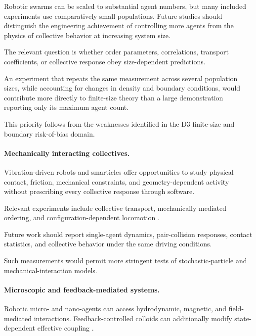 Robotic swarms can be scaled to
substantial agent numbers, but many
included experiments use comparatively
small populations. Future studies
should distinguish the engineering
achievement of controlling more agents
from the physics of collective
behavior at increasing system size.

The relevant question is whether
order parameters, correlations,
transport coefficients, or
collective response obey
size-dependent predictions.

An experiment that repeats the same
measurement across several population
sizes, while accounting for changes
in density and boundary conditions,
would contribute more directly to
finite-size theory than a
large demonstration reporting
only its maximum agent count.

This priority follows from the
weaknesses identified in the
D3 finite-size and boundary
risk-of-bias domain.

\paragraph*{Mechanically interacting collectives.}

Vibration-driven robots and smarticles
offer opportunities to study physical
contact, friction, mechanical
constraints, and geometry-dependent
activity without prescribing every
collective response through software.

Relevant experiments include
collective transport, mechanically
mediated ordering, and
configuration-dependent locomotion
\cite{Chvykov2020lowrattlingapred,Li2020programmingactiveg,Savoie2019arobotmadeofrobo,Bhamla2021collectivetransport,Wang2025hyperuniformnetwork}.

Future work should report
single-agent dynamics,
pair-collision responses,
contact statistics,
and collective behavior
under the same driving conditions.

Such measurements would permit
more stringent tests of
stochastic-particle and
mechanical-interaction models.

\paragraph*{Microscopic and feedback-mediated systems.}

Robotic micro- and nano-agents can
access hydrodynamic, magnetic,
and field-mediated interactions.
Feedback-controlled colloids
can additionally modify
state-dependent effective
coupling
\cite{Sun2021swarmingmicrodrople,Pauer2021programmabledesign,Heuthe2025tunablecolloidalsw,Guo2026afeedbackcontrolle}.


